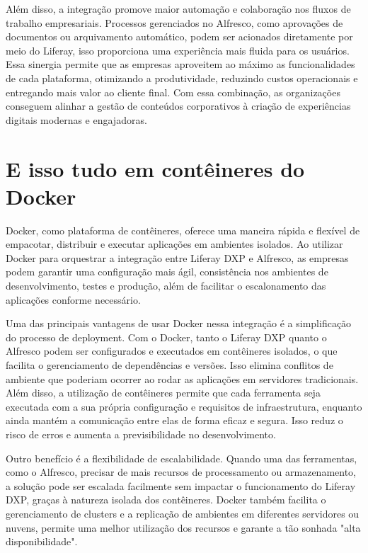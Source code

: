 \documentclass[a4paper,11pt]{article}
\begin{document}
Além disso, a integração promove maior automação e colaboração nos fluxos de trabalho empresariais. Processos gerenciados no Alfresco, como aprovações de documentos ou arquivamento automático, podem ser acionados diretamente por meio do Liferay, isso proporciona uma experiência mais fluida para os usuários. Essa sinergia permite que as empresas aproveitem ao máximo as funcionalidades de cada plataforma, otimizando a produtividade, reduzindo custos operacionais e entregando mais valor ao cliente final. Com essa combinação, as organizações conseguem alinhar a gestão de conteúdos corporativos à criação de experiências digitais modernas e engajadoras.

\section{E isso tudo em contêineres do Docker}
Docker, como plataforma de contêineres, oferece uma maneira rápida e flexível de empacotar, distribuir e executar aplicações em ambientes isolados. Ao utilizar Docker para orquestrar a integração entre Liferay DXP e Alfresco, as empresas podem garantir uma configuração mais ágil, consistência nos ambientes de desenvolvimento, testes e produção, além de facilitar o escalonamento das aplicações conforme necessário.

Uma das principais vantagens de usar Docker nessa integração é a simplificação do processo de deployment. Com o Docker, tanto o Liferay DXP quanto o Alfresco podem ser configurados e executados em contêineres isolados, o que facilita o gerenciamento de dependências e versões. Isso elimina conflitos de ambiente que poderiam ocorrer ao rodar as aplicações em servidores tradicionais. Além disso, a utilização de contêineres permite que cada ferramenta seja executada com a sua própria configuração e requisitos de infraestrutura, enquanto ainda mantém a comunicação entre elas de forma eficaz e segura. Isso reduz o risco de erros e aumenta a previsibilidade no desenvolvimento.

Outro benefício é a flexibilidade de escalabilidade. Quando uma das ferramentas, como o Alfresco, precisar de mais recursos de processamento ou armazenamento, a solução pode ser escalada facilmente sem impactar o funcionamento do Liferay DXP, graças à natureza isolada dos contêineres. Docker também facilita o gerenciamento de clusters e a replicação de ambientes em diferentes servidores ou nuvens, permite uma melhor utilização dos recursos e garante a tão sonhada "alta disponibilidade".
\end{document}
